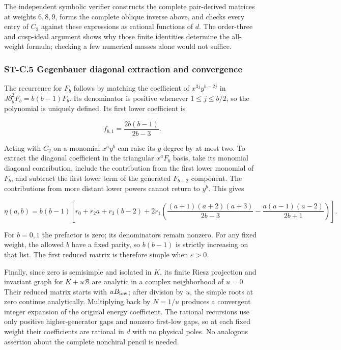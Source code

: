 The independent symbolic verifier constructs the complete pair-derived matrices at weights \(6,8,9\), forms the complete oblique inverse above, and checks every entry of \(C_2\) against these expressions as rational functions of \(d\). The order-three and cusp-ideal argument shows why those finite identities determine the all-weight formula; checking a few numerical masses alone would not suffice.

\hypertarget{st-c.5-gegenbauer-diagonal-extraction-and-convergence}{%
\subsubsection{ST-C.5 Gegenbauer diagonal extraction and convergence}\label{st-c.5-gegenbauer-diagonal-extraction-and-convergence}}

The recurrence for \(F_b\) follows by matching the coefficient of \(x^{3j}y^{b-2j}\) in \(J\partial_y^2F_b=b(b-1)F_b\). Its denominator is positive whenever \(1\leq j\leq b/2\), so the polynomial is uniquely defined. Its first lower coefficient is

\[
f_{b,1}=\frac{2b(b-1)}{2b-3}.
\]

Acting with \(C_2\) on a monomial \(x^ay^b\) can raise its \(y\) degree by at most two. To extract the diagonal coefficient in the triangular \(x^aF_b\) basis, take its monomial diagonal contribution, include the contribution from the first lower monomial of \(F_b\), and subtract the first lower term of the generated \(F_{b+2}\) component. The contributions from more distant lower powers cannot return to \(y^b\). This gives

\[
\eta(a,b)=b(b-1)\left[
r_0+r_2a+r_3(b-2)+
2r_1\left(
\frac{(a+1)(a+2)(a+3)}{2b-3}
-\frac{a(a-1)(a-2)}{2b+1}\right)\right].
\]

For \(b=0,1\) the prefactor is zero; its denominators remain nonzero. For any fixed weight, the allowed \(b\) have a fixed parity, so \(b(b-1)\) is strictly increasing on that list. The first reduced matrix is therefore simple when \(\varepsilon>0\).

Finally, since zero is semisimple and isolated in \(K\), its finite Riesz projection and invariant graph for \(K+u\mathscr B\) are analytic in a complex neighborhood of \(u=0\). Their reduced matrix starts with \(uB_{\rm low}\); after division by \(u\), the simple roots at zero continue analytically. Multiplying back by \(N=1/u\) produces a convergent integer expansion of the original energy coefficient. The rational recursions use only positive higher-generator gaps and nonzero first-low gaps, so at each fixed weight their coefficients are rational in \(d\) with no physical poles. No analogous assertion about the complete nonchiral pencil is needed.

